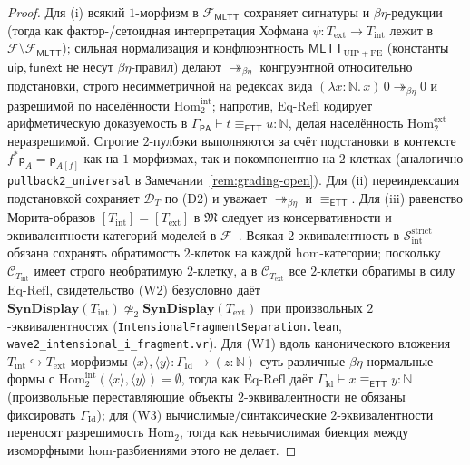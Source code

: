\documentclass[11pt]{article}
\theoremstyle{plain}
\theoremstyle{definition}
\newcommand{\cF}{\mathcal{F}}
\newcommand{\cC}{\mathcal{C}}
\newcommand{\cD}{\mathcal{D}}
\newcommand{\fM}{\mathfrak{M}}
\newcommand{\Hom}{\mathrm{Hom}}
\newcommand{\PA}{\mathsf{PA}}
\newcommand{\MLTT}{\mathsf{MLTT}}
\newcommand{\ETT}{\mathsf{ETT}}
\begin{document}
\begin{proof}
Для (i) всякий $1$-морфизм в $\mathcal{F}_{\MLTT}$ сохраняет сигнатуры и $\beta\eta$-редукции (тогда как фактор-/сетоидная интерпретация Хофмана $\psi : T_{\mathrm{ext}} \to T_{\mathrm{int}}$ лежит в $\cF \setminus \mathcal{F}_{\MLTT}$); сильная нормализация и конфлюэнтность $\MLTT_{\mathrm{UIP}+\mathrm{FE}}$ (константы $\mathsf{uip}, \mathsf{funext}$ не несут $\beta\eta$-правил) делают $\twoheadrightarrow_{\beta\eta}$ конгруэнтной относительно подстановки, строго несимметричной на редексах вида $(\lambda x:\mathbb{N}.\,x)\,0 \twoheadrightarrow_{\beta\eta} 0$ и разрешимой по населённости $\Hom_2^{\mathrm{int}}$; напротив, $\text{Eq-Refl}$ кодирует арифметическую доказуемость в $\Gamma_{\PA} \vdash t \equiv_{\ETT} u : \mathbb{N}$, делая населённость $\Hom_2^{\mathrm{ext}}$ неразрешимой. Строгие $2$-пулбэки выполняются за счёт подстановки в контексте $f^*\mathsf{p}_A = \mathsf{p}_{A[f]}$ как на $1$-морфизмах, так и покомпонентно на $2$-клетках (аналогично \texttt{pullback2\_\allowbreak universal} в Замечании~\ref{rem:grading-open}). Для (ii) переиндексация подстановкой сохраняет $\cD_T$ по (D2) и уважает $\twoheadrightarrow_{\beta\eta}$ и $\equiv_{\ETT}$. Для (iii) равенство Морита-образов $[T_{\mathrm{int}}] = [T_{\mathrm{ext}}]$ в $\fM$ следует из консервативности и эквивалентности категорий моделей в $\cF$~\cite{Hofmann1995,KapulkinLi2025}. Всякая $2$-эквивалентность в $\mathcal{S}_{\mathrm{int}}^{\mathrm{strict}}$ обязана сохранять обратимость $2$-клеток на каждой hom-категории; поскольку $\cC_{T_{\mathrm{int}}}$ имеет строго необратимую $2$-клетку, а в $\cC_{T_{\mathrm{ext}}}$ все $2$-клетки обратимы в силу $\text{Eq-Refl}$, свидетельство (W2) безусловно даёт $\mathbf{SynDisplay}(T_{\mathrm{int}}) \not\simeq_2 \mathbf{SynDisplay}(T_{\mathrm{ext}})$ при произвольных $2$-эквивалентностях (\texttt{IntensionalFragmentSeparation.lean}, \texttt{wave2\_intensional\_i\_fragment.vr}). Для (W1) вдоль канонического вложения $T_{\mathrm{int}} \hookrightarrow T_{\mathrm{ext}}$ морфизмы $\langle x \rangle, \langle y \rangle : \Gamma_{\mathrm{Id}} \to (z:\mathbb{N})$ суть различные $\beta\eta$-нормальные формы с $\Hom_2^{\mathrm{int}}(\langle x \rangle, \langle y \rangle) = \emptyset$, тогда как $\text{Eq-Refl}$ даёт $\Gamma_{\mathrm{Id}} \vdash x \equiv_{\ETT} y : \mathbb{N}$ (произвольные переставляющие объекты $2$-эквивалентности не обязаны фиксировать $\Gamma_{\mathrm{Id}}$); для (W3) вычислимые/синтаксические $2$-эквивалентности переносят разрешимость $\Hom_2$, тогда как невычислимая биекция между изоморфными hom-разбиениями этого не делает.
\end{proof}
\end{document}
